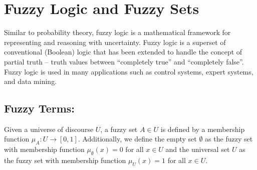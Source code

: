\section{Fuzzy Logic and Fuzzy Sets}
Similar to probability theory, fuzzy logic is a mathematical framework for representing and reasoning with uncertainty. Fuzzy logic is a superset of conventional (Boolean) logic that has been extended to handle the concept of partial truth -- truth values between ``completely true'' and ``completely false''. Fuzzy logic is used in many applications such as control systems, expert systems, and data mining.
\subsection{Fuzzy Terms:} Given a universe of discourse $U$, a fuzzy set $A\in U$ is defined by a membership function $\mu_A:U\rightarrow[0,1]$.
Additionally, we define the empty set $\emptyset$ as the fuzzy set with membership function $\mu_{\emptyset}(x)=0$ for all $x\in U$ and the universal set $U$ as the fuzzy set with membership function $\mu_U(x)=1$ for all $x\in U$.
